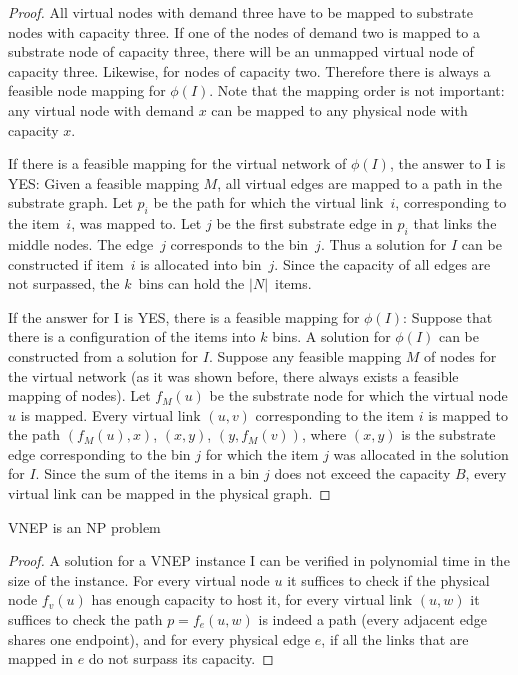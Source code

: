 \begin{proof}
All virtual nodes with demand three have to be mapped to substrate nodes with capacity three.
If one of the nodes of demand two is mapped to a substrate node of capacity three, there will be an unmapped virtual node of capacity three. 
Likewise, for nodes of capacity two.
Therefore there is always a feasible node mapping for $\phi(I)$. 
Note that the mapping order is not important: any virtual node with demand $x$ can be mapped to any physical node with capacity $x$.

If there is a feasible mapping for the virtual network of $\phi(I)$, the answer to I is YES:
Given a feasible mapping $M$, all virtual edges are mapped to a path in the substrate graph. 
Let $p_{i}$ be the path for which the virtual link~$i$, corresponding to the item~$i$, was mapped to. 
Let $j$ be the first substrate edge in $p_{i}$ that links the middle nodes. The edge~$j$ corresponds to the bin~$j$. Thus a solution for $I$ can be constructed if item~$i$ is allocated into bin~$j$. 
Since the capacity of all edges are not surpassed, the $k$~bins can hold the $|N|$~items.

If the answer for I is YES, there is a feasible mapping for $\phi(I)$:
Suppose that there is a configuration of the items into $k$ bins.
A solution for $\phi(I)$ can be constructed from a solution for $I$.
Suppose any feasible mapping $M$ of nodes for the virtual network (as it was shown before, there always exists a feasible mapping of nodes).
Let $f_{M}(u)$ be the substrate node for which the virtual node $u$ is mapped. 
Every virtual link $(u,v)$ corresponding to the item $i$ is mapped to the path $(f_{M}(u), x)$, $(x,y)$, $(y,f_{M}(v))$, where $(x,y)$ is the substrate edge corresponding to the bin $j$ for which the item $j$ was allocated in the solution for $I$.
Since the sum of the items in a bin $j$ does not exceed the capacity $B$, every virtual link can be mapped in the physical graph.
\end{proof}

\begin{lemma} \label{lem:cert}
  VNEP is an NP problem
\end{lemma}

\begin{proof}
  A solution for a VNEP instance I can be verified in polynomial time in the size of the instance. For every virtual node $u$ it suffices to check if the physical node $f_v(u)$ has enough capacity to host it, for every virtual link $(u,w)$ it suffices to check the path $p = f_e(u,w)$ is indeed a path (every adjacent edge shares one endpoint), and for every physical edge $e$, if all the links that are mapped in $e$ do not surpass its capacity.
\end{proof}

